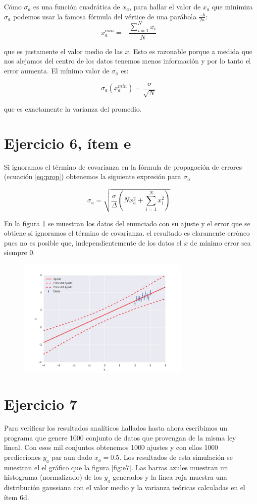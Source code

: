 Cómo $\sigma_a$ es una función cuadrática de $x_a$, para hallar el valor de $x_a$ que minimiza $\sigma_a$ podemos usar la famosa fórmula del vértice de una parábola $\frac{-b}{2a}$:
$$
x_a^{min} = -\frac{\sum_{i=1}^N x_i}{N}
$$

que es justamente el valor medio de las $x$. 
Esto es razonable porque a medida que nos alejamos del centro de los datos tenemos menos información y por lo tanto el error aumenta. 
El mínimo valor de $\sigma_a$ es:

$$
\sigma_a(x_a^{min}) = \frac{\sigma}{\sqrt{N}}
$$

que es exactamente la varianza del promedio.

\section*{Ejercicio 6, ítem e}
Si ignoramos el término de covarianza en la fórmula de propagación de errores (ecuación \ref{eq:prop}) obtenemos la siguiente expresión para $\sigma_a$ 

$$
\sigma_a = \sqrt{\frac{\sigma}{\Delta}(N x_a^2 + \sum_{i=1}^N x_i^2)}
$$

En la figura \ref{fig:e6e} se muestran los datos del enunciado con su ajuste y el error que se obtiene si ignoramos el término de covarianza. 
el resultado es claramente erróneo pues no es posible que, independientemente de los datos el $x$ de mínimo error sea siempre $0$.

\begin{figure}
\centering
\includegraphics[width=0.75\textwidth]{ej6e.jpg}
\caption[]{}
\label{fig:e6e}
\end{figure}

\section*{Ejercicio 7}
Para verificar los resultados analíticos hallados hasta ahora escribimos un programa que genere 1000 conjunto de datos que provengan de la misma ley lineal.
Con esos mil conjuntos obtenemos 1000 ajustes y con ellos 1000 predicciones $y_a$ par aun dado $x_a=0.5$.
Los resultados de esta simulación se muestran el el gráfico que la figura \ref{fig:e7}.
Las barras azules muestran un histograma (normalizado) de los $y_a$ generados y la linea roja muestra una distribución gaussiana con el valor medio y la varianza teóricas calculadas en el ítem 6d. 

